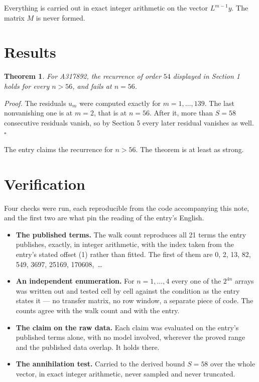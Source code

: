 \documentclass[11pt]{article}
\newtheorem{theorem}{Theorem}
\theoremstyle{definition}
\begin{document}
Everything is carried out in exact integer arithmetic on the vector $L^{m-1}y$. The matrix $M$ is never formed.

\section{Results}

\begin{theorem} For A317892, the recurrence of order $54$ displayed in Section 1 holds for every $n > 56$, and fails at $n = 56$.\end{theorem}

{\itshape Proof.} The residuals $u_m$ were computed exactly for $m = 1,\dots,139$. The last nonvanishing one is at $m = 2$, that is at $n = 56$. After it, more than $S = 58$ consecutive residuals vanish, so by Section 5 every later residual vanishes as well. $\square$

The entry claims the recurrence for $n > 56$. The theorem is at least as strong.

\section{Verification}

Four checks were run, each reproducible from the code accompanying this note, and the first two are what pin the reading of the entry's English.

\begin{itemize}

\item {\bfseries The published terms.} The walk count reproduces all 21 terms the entry publishes, exactly, in integer arithmetic, with the index taken from the entry's stated offset (1) rather than fitted. The first of them are 0, 2, 13, 82, 549, 3697, 25169, 170608,~\dots

\item {\bfseries An independent enumeration.} For $n = 1,\dots,4$ every one of the $2^{4n}$ arrays was written out and tested cell by cell against the condition as the entry states it --- no transfer matrix, no row window, a separate piece of code. The counts agree with the walk count and with the entry.

\item {\bfseries The claim on the raw data.} Each claim was evaluated on the entry's published terms alone, with no model involved, wherever the proved range and the published data overlap. It holds there.

\item {\bfseries The annihilation test.} Carried to the derived bound $S = 58$ over the whole vector, in exact integer arithmetic, never sampled and never truncated.

\end{itemize}
\end{document}
